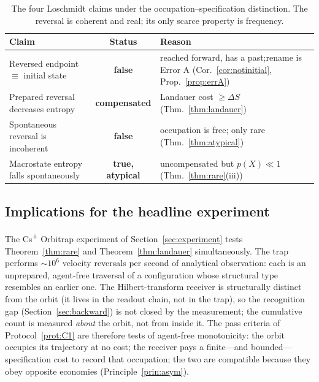 \documentclass[twocolumn,10pt,a4paper]{article}
\theoremstyle{thmstyle}
\theoremstyle{definition}
\theoremstyle{remark}
\begin{document}
\begin{table}[H]
\centering
\small
\begin{tabular}{p{4.8cm}cp{6.8cm}}
\toprule
Claim & Status & Reason \\
\midrule
Reversed endpoint $\equiv$ initial state &
\textbf{false} &
reached forward, has a past;\newline rename is Error A
(Cor.~\ref{cor:notinitial}, Prop.~\ref{prop:errA}) \\
Prepared reversal decreases entropy &
\textbf{compensated} &
Landauer cost $\geq\Delta S$
(Thm.~\ref{thm:landauer}) \\
Spontaneous reversal is incoherent &
\textbf{false} &
occupation is free; only rare\newline
(Thm.~\ref{thm:atypical}) \\
Macrostate entropy falls spontaneously &
\textbf{true, atypical} &
uncompensated but $p(X)\ll 1$\newline
(Thm.~\ref{thm:rare}(iii)) \\
\bottomrule
\end{tabular}
\caption{The four Loschmidt claims under the
occupation--specification distinction. The reversal is coherent and
real; its only scarce property is frequency.}
\label{tab:lossummary}
\end{table}

\subsection{Implications for the headline experiment}

The Cs\textsuperscript{+} Orbitrap experiment of
Section~\ref{sec:experiment} tests Theorem~\ref{thm:rare} and
Theorem~\ref{thm:landauer} simultaneously. The trap performs
$\sim 10^{6}$ velocity reversals per second of analytical
observation: each is an unprepared, agent-free traversal of a
configuration whose structural type resembles an earlier one. The
Hilbert-transform receiver is structurally distinct from the orbit
(it lives in the readout chain, not in the trap), so the
recognition gap (Section~\ref{sec:backward}) is not closed by the
measurement; the cumulative count is measured \emph{about} the
orbit, not from inside it. The pass criteria of
Protocol~\ref{prot:C1} are therefore tests of agent-free
monotonicity: the orbit occupies its trajectory at no cost; the
receiver pays a finite---and bounded---specification cost to record
that occupation; the two are compatible because they obey opposite
economies (Principle~\ref{prin:asym}).
\end{document}
